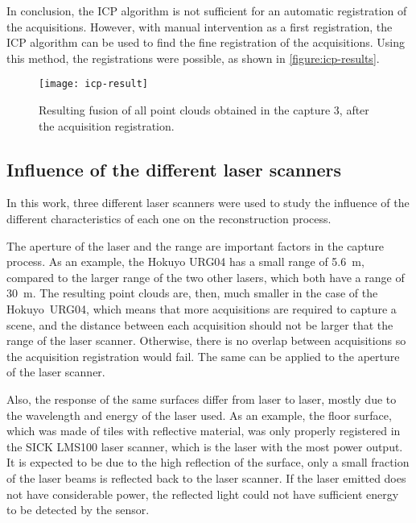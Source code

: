 In conclusion, the ICP algorithm is not sufficient for an automatic registration of the acquisitions. However, with manual intervention as a first registration, the ICP algorithm can be used to find the fine registration of the acquisitions. Using this method, the registrations were possible, as shown in \cref{figure:icp-results}.

\begin{figure}[h]
    
    \centering
    \texttt{[image: icp-result]}

    \caption{Resulting fusion of all point clouds obtained in the capture 3, after the acquisition registration.}
    \label{section:icp-result}

\end{figure}

\subsection{Influence of the different laser scanners}

In this work, three different laser scanners were used to study the influence of the different characteristics of each one on the reconstruction process.

The aperture of the laser and the range are important factors in the capture process. As an example, the Hokuyo URG04 has a small range of \SI{5.6}{\meter}, compared to the larger range of the two other lasers, which both have a range of \SI{30}{\meter}. The resulting point clouds are, then, much smaller in the case of the Hokuyo~URG04, which means that more acquisitions are required to capture a scene, and the distance between each acquisition should not be larger that the range of the laser scanner. Otherwise, there is no overlap between acquisitions so the acquisition registration would fail. The same can be applied to the aperture of the laser scanner. 

Also, the response of the same surfaces differ from laser to laser, mostly due to the wavelength and energy of the laser used. As an example, the floor surface, which was made of tiles with reflective material, was only properly registered in the SICK LMS100 laser scanner, which is the laser with the most power output. It is expected to be due to the high reflection of the surface, only a small fraction of the laser beams is reflected back to the laser scanner. If the laser emitted does not have considerable power, the reflected light could not have sufficient energy to be detected by the sensor. 

